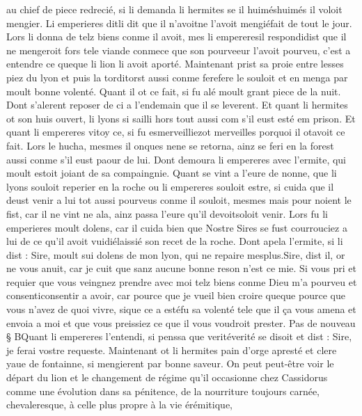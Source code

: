 \documentclass{article}
\begin{document}
\begin{pages}
   au chief de piece redrecié, 
   si li demanda li hermites 
   se il huiméshuimés il voloit mengier. 
   Li emperieres ditli dit que 
   il n’avoitne l'avoit 
      mengiéfait de tout le jour. 
   Lors li donna de telz biens conme il avoit, mes 
   li empereresil 
   respondidist que il ne mengeroit fors 
      tele viande conmece que son pourveeur l’avoit pourveu, 
      c’est a entendre ce queque li 
         lion li avoit aporté. \pend
\pstart Maintenant prist sa proie entre 
   lesses piez du lyon 
   et puis la torditorst aussi conme 
   ferefere le souloit et en 
   menga par moult bonne volenté. Quant il ot ce fait, 
   si fu alé moult grant piece de la nuit. Dont s’alerent reposer de ci a l’endemain que il se leverent. 
   Et quant li hermites ot son huis ouvert, 
   li lyons si sailli hors tout aussi com s’il eust esté em prison. 
   Et quant li empereres vitoy ce, si 
   fu esmerveilliezot merveilles porquoi il 
   otavoit ce fait. 
   Lors le hucha, mesmes il onques 
   nene se retorna, ainz se feri en 
   la forest aussi conme s’il eust paour de lui. 
   Dont demoura li empereres avec l’ermite, 
   qui moult estoit joiant de sa compaingnie. Quant se vint a l’eure de nonne, que li lyons 
   souloit reperier en la roche ou li empereres 
   souloit estre, si cuida que il deust venir a lui tot aussi pourveus conme il souloit, 
   mesmes mais pour noient le fist, car il ne vint ne ala, 
   ainz passa l’eure qu’il devoitsoloit venir. 
   Lors fu li emperieres moult dolens, car il cuida bien que Nostre Sires 
   se fust courrouciez a lui de ce qu’il avoit 
   vuidiélaissié son recet de la roche. 
   Dont apela l’ermite, si li dist :
   Sire, moult sui dolens de mon lyon, qui ne repaire 
      mesplus.Sire, dist il, or ne vous anuit, car je cuit que sanz aucune bonne reson n’est ce mie. 
      Si vous pri et requier que vous veingnez prendre avec moi telz biens conme Dieu m’a pourveu et 
      consenticonsentir a avoir, 
   car pource que je vueil bien croire 
      queque pource que vous n’avez de quoi vivre, 
      sique ce
      a estéfu sa volenté
      tele que il ça vous 
      amena et envoia a moi et 
      que vous preissiez ce que il vous voudroit prester. \pend
\pstart Pas de nouveau § BQuant li empereres 
   l’entendi, si penssa que veritéverité se disoit et dist :
   Sire, je ferai vostre requeste.
   Maintenant ot li hermites pain d’orge apresté et clere yaue de fontainne, 
   si mengierent par bonne saveur. 
   On peut peut-être voir le départ du lion et le changement de régime qu'il occasionne chez Cassidorus 
   comme une évolution dans sa pénitence, de la nourriture toujours carnée, chevaleresque, à celle plus propre à la vie érémitique,

\end{pages}
\end{document}
